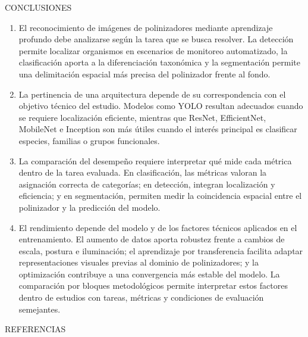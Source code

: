 \documentclass[final,t]{beamer}
\begin{document}
\begin{frame}[t]
\begin{block}{CONCLUSIONES}
\vspace{-0.8cm}
\begin{enumerate}
\item El reconocimiento de imágenes de polinizadores mediante aprendizaje profundo debe analizarse según la tarea que se busca resolver. La detección permite localizar organismos en escenarios de monitoreo automatizado, la clasificación aporta a la diferenciación taxonómica y la segmentación permite una delimitación espacial más precisa del polinizador frente al fondo.
\item La pertinencia de una arquitectura depende de su correspondencia con el objetivo técnico del estudio. Modelos como YOLO resultan adecuados cuando se requiere localización eficiente, mientras que ResNet, EfficientNet, MobileNet e Inception son más útiles cuando el interés principal es clasificar especies, familias o grupos funcionales.
\item La comparación del desempeño requiere interpretar qué mide cada métrica dentro de la tarea evaluada. En clasificación, las métricas valoran la asignación correcta de categorías; en detección, integran localización y eficiencia; y en segmentación, permiten medir la coincidencia espacial entre el polinizador y la predicción del modelo.
\item El rendimiento depende del modelo y de los factores técnicos aplicados en el entrenamiento. El aumento de datos aporta robustez frente a cambios de escala, postura e iluminación; el aprendizaje por transferencia facilita adaptar representaciones visuales previas al dominio de polinizadores; y la optimización contribuye a una convergencia más estable del modelo. La comparación por bloques metodológicos permite interpretar estos factores dentro de estudios con tareas, métricas y condiciones de evaluación semejantes.
\end{enumerate}
\end{block}



\vspace{0.2cm}

\begin{block}{REFERENCIAS}%
\small
\nocite{*}
\printbibliography
\end{block}

\vspace{\fill}
\noindent\hspace*{-10mm}{\color{azul}\rule{1.1\linewidth}{1.2cm}}

\end{frame}
\end{document}
